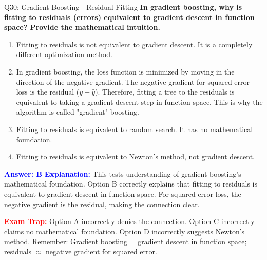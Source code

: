 \documentclass[8pt]{beamer}
\begin{document}
	\begin{frame}{Q30: Gradient Boosting - Residual Fitting}
		\fontsize{6.5}{7.5}\selectfont
		\textbf{In gradient boosting, why is fitting to residuals (errors) equivalent to gradient descent in function space? Provide the mathematical intuition.}
		
		\begin{enumerate}
			\item Fitting to residuals is not equivalent to gradient descent. It is a completely different optimization method.
			\item In gradient boosting, the loss function is minimized by moving in the direction of the negative gradient. The negative gradient for squared error loss is the residual ($y - \hat{y}$). Therefore, fitting a tree to the residuals is equivalent to taking a gradient descent step in function space. This is why the algorithm is called "gradient" boosting.
			\item Fitting to residuals is equivalent to random search. It has no mathematical foundation.
			\item Fitting to residuals is equivalent to Newton's method, not gradient descent.
		\end{enumerate}
		
		\vspace{0.1cm}
		\textcolor{blue}{\textbf{Answer: B}}
		\vspace{0.1cm}
		\textcolor{blue}{\textbf{Explanation:}} This tests understanding of gradient boosting's mathematical foundation. Option B correctly explains that fitting to residuals is equivalent to gradient descent in function space. For squared error loss, the negative gradient is the residual, making the connection clear.
		
		\textcolor{red}{\textbf{Exam Trap:}} Option A incorrectly denies the connection. Option C incorrectly claims no mathematical foundation. Option D incorrectly suggests Newton's method. Remember: Gradient boosting = gradient descent in function space; residuals $\approx$ negative gradient for squared error.
	\end{frame}
	
\end{document}
